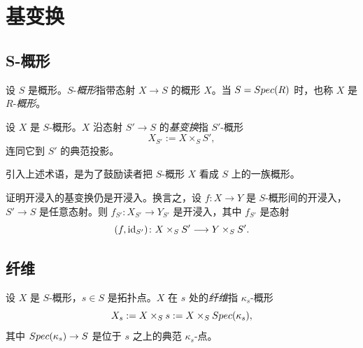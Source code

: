 
\section{基变换}\label{sec:10}

\subsection{S-概形}\label{sec:10.1}

\begin{definition}\label{def:10.1.1}
设 $S$ 是概形。$S$-\emph{概形}指带态射 $X \to S$ 的概形 $X$。当 $S = Spec(R)$ 时，也称 $X$ 是 $R$-\emph{概形}。
\end{definition}

\begin{definition}\label{def:10.1.2}
设 $X$ 是 $S$-概形。$X$ 沿态射 $S' \to S$ 的\emph{基变换}指 $S'$-概形
\[
X_{S'} := X \times_S S',
\]
连同它到 $S'$ 的典范投影。
\end{definition}

\begin{remark}\label{rem:10.1.3}
引入上述术语，是为了鼓励读者把 $S$-概形 $X$ 看成 $S$ 上的一族概形。
\end{remark}

\begin{exercise}\label{exc:10.1.4}
证明开浸入的基变换仍是开浸入。换言之，设 $f \colon X \to Y$ 是 $S$-概形间的开浸入，$S' \to S$ 是任意态射。则 $f_{S'} \colon X_{S'} \to Y_{S'}$ 是开浸入，其中 $f_{S'}$ 是态射
\[
(f, \operatorname{id}_{S'}) \colon X \times_S S' \longrightarrow Y \times_S S'.
\]
\end{exercise}

\subsection{纤维}\label{sec:10.2}

\begin{definition}\label{def:10.2.1}
设 $X$ 是 $S$-概形，$s \in S$ 是拓扑点。$X$ 在 $s$ 处的\emph{纤维}指 $\kappa_s$-概形
\[
X_s := X \times_S s := X \times_S Spec(\kappa_s),
\]
其中 $Spec(\kappa_s) \to S$ 是位于 $s$ 之上的典范 $\kappa_s$-点。
\end{definition}

